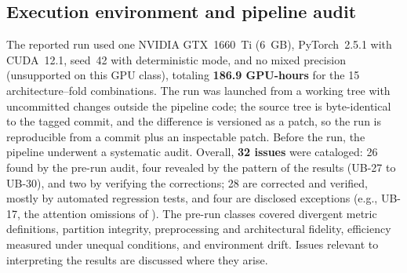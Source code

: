 \subsection{Execution environment and pipeline audit} \label{subsec:auditoria_defeitos}

The reported run used one NVIDIA GTX~1660~Ti (6~GB), PyTorch~2.5.1 with CUDA~12.1, seed~42 with deterministic mode, and no mixed precision (unsupported on this GPU class), totaling \textbf{186.9 GPU-hours} for the 15 architecture--fold combinations.
The run was launched from a working tree with uncommitted changes outside the pipeline code; the source tree is byte-identical to the tagged commit, and the difference is versioned as a patch, so the run is reproducible from a commit plus an inspectable patch.
Before the run, the pipeline underwent a systematic audit.
Overall, \textbf{32 issues} were cataloged: 26 found by the pre-run audit, four revealed by the pattern of the results (UB-27 to UB-30), and two by verifying the corrections; 28 are corrected and verified, mostly by automated regression tests, and four are disclosed exceptions (e.g., UB-17, the attention omissions of \swinp{}).
The pre-run classes covered divergent metric definitions, partition integrity, preprocessing and architectural fidelity, efficiency measured under unequal conditions, and environment drift.
Issues relevant to interpreting the results are discussed where they arise.
